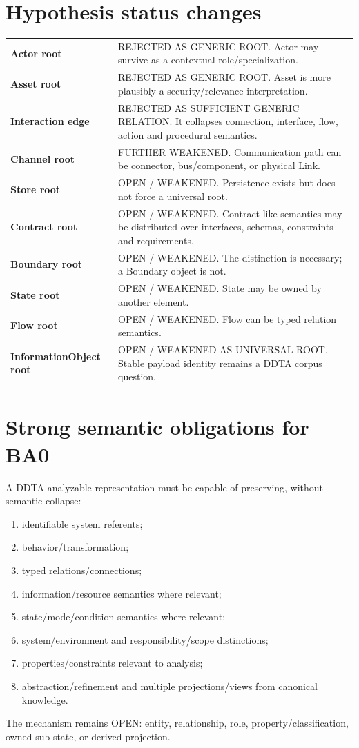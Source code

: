\documentclass[10pt,a4paper]{article}
\begin{document}
\section{Hypothesis status changes}
\begin{tabularx}{\linewidth}{>{\bfseries}p{4.4cm}X}
Actor root & REJECTED AS GENERIC ROOT. Actor may survive as a contextual role/specialization.\\
Asset root & REJECTED AS GENERIC ROOT. Asset is more plausibly a security/relevance interpretation.\\
Interaction edge & REJECTED AS SUFFICIENT GENERIC RELATION. It collapses connection, interface, flow, action and procedural semantics.\\
Channel root & FURTHER WEAKENED. Communication path can be connector, bus/component, or physical Link.\\
Store root & OPEN / WEAKENED. Persistence exists but does not force a universal root.\\
Contract root & OPEN / WEAKENED. Contract-like semantics may be distributed over interfaces, schemas, constraints and requirements.\\
Boundary root & OPEN / WEAKENED. The distinction is necessary; a Boundary object is not.\\
State root & OPEN / WEAKENED. State may be owned by another element.\\
Flow root & OPEN / WEAKENED. Flow can be typed relation semantics.\\
InformationObject root & OPEN / WEAKENED AS UNIVERSAL ROOT. Stable payload identity remains a DDTA corpus question.\\
\end{tabularx}
\section{Strong semantic obligations for BA0}
A DDTA analyzable representation must be capable of preserving, without semantic collapse:
\begin{enumerate}
\item identifiable system referents;
\item behavior/transformation;
\item typed relations/connections;
\item information/resource semantics where relevant;
\item state/mode/condition semantics where relevant;
\item system/environment and responsibility/scope distinctions;
\item properties/constraints relevant to analysis;
\item abstraction/refinement and multiple projections/views from canonical knowledge.
\end{enumerate}
The mechanism remains OPEN: entity, relationship, role, property/classification, owned sub-state, or derived projection.
\end{document}
